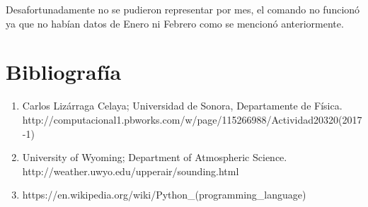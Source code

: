 \documentclass[12pt,a4paper]{article}
\begin{document}
Desafortunadamente no se pudieron representar por mes, el comando no funcionó ya que no habían datos de Enero ni Febrero como se mencionó anteriormente.

\newpage

\section{Bibliografía}

\begin{enumerate}

\item  Carlos Lizárraga Celaya; Universidad de Sonora, Departamente de Física. \\ http://computacional1.pbworks.com/w/page/115266988/Actividad20320(2017-1)

\item University of Wyoming; Department of Atmospheric Science. \\
http://weather.uwyo.edu/upperair/sounding.html

\item https://en.wikipedia.org/wiki/Python\_(programming\_language)

\end{enumerate}
\end{document}
